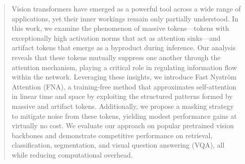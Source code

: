 \begin{abstract} 
Vision transformers have emerged as a powerful tool across a wide range of applications, yet their inner workings remain only partially understood. In this work, we examine the phenomenon of massive tokens—tokens with exceptionally high activation norms that act as attention sinks—and artifact tokens that emerge as a byproduct during inference. Our analysis reveals that these tokens mutually suppress one another through the attention mechanism, playing a critical role in regulating information flow within the network. Leveraging these insights, we introduce Fast Nystr\"om Attention (FNA), a training-free method that approximates self-attention in linear time and space by exploiting the structured patterns formed by massive and artifact tokens. Additionally, we propose a masking strategy to mitigate noise from these tokens, yielding modest performance gains at virtually no cost. We evaluate our approach on popular pretrained vision backbones and demonstrate competitive performance on retrieval, classification, segmentation, and visual question answering (VQA), all while reducing computational overhead. \end{abstract}
